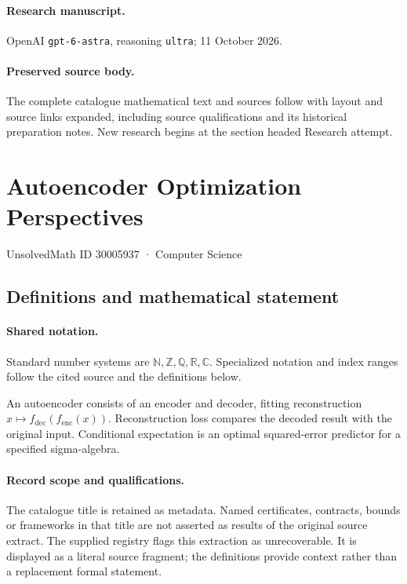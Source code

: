 \documentclass[11pt]{article}
\begin{document}
\paragraph{Research manuscript.} OpenAI \texttt{gpt-6-astra}, reasoning \texttt{ultra}; 11 October 2026.
\paragraph{Preserved source body.} The complete catalogue mathematical text and sources follow with layout and source links expanded, including source qualifications and its historical preparation notes. New research begins at the section headed Research attempt.

\section{Autoencoder Optimization Perspectives}\label{30005937}
{\small UnsolvedMath ID 30005937 · Computer Science}
\subsection{Definitions and mathematical statement}

\paragraph{Shared notation.}Standard number systems are $\mathbb N,\mathbb Z,\mathbb Q,\mathbb R,\mathbb C$. Specialized notation and index ranges follow the cited source and the definitions below.


An autoencoder consists of an encoder and decoder, fitting reconstruction $x\mapsto f_{\mathrm{dec}}(f_{\mathrm{enc}}(x))$. Reconstruction loss compares the decoded result with the original input. Conditional expectation is an optimal squared-error predictor for a specified sigma-algebra.
\paragraph{Record scope and qualifications.}
The catalogue title is retained as metadata. Named certificates, contracts, bounds or frameworks in that title are not asserted as results of the original source extract.
The supplied registry flags this extraction as unrecoverable. It is displayed as a literal source fragment; the definitions provide context rather than a replacement formal statement.
\end{document}
